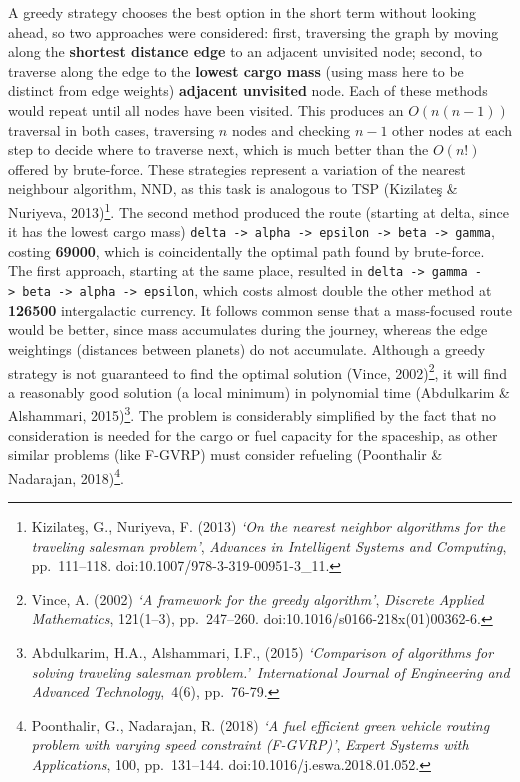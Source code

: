 \documentclass[
]{article}
\begin{document}
A greedy strategy chooses the best option in the short term without
looking ahead, so two approaches were considered: first, traversing the
graph by moving along the \textbf{shortest distance edge} to an adjacent
unvisited node; second, to traverse along the edge to the \textbf{lowest
cargo mass} (using mass here to be distinct from edge weights)
\textbf{adjacent unvisited} node. Each of these methods would repeat
until all nodes have been visited. This produces an \(O(n(n-1))\)
traversal in both cases, traversing \(n\) nodes and checking \(n-1\)
other nodes at each step to decide where to traverse next, which is much
better than the \(O(n!)\) offered by brute-force. These strategies
represent a variation of the nearest neighbour algorithm, NND, as this
task is analogous to TSP (Kizilateş \& Nuriyeva, 2013)\footnote{Kizilateş,
  G., Nuriyeva, F. (2013) \emph{`On the nearest neighbor algorithms for
  the traveling salesman problem'}, \emph{Advances in Intelligent
  Systems and Computing}, pp.~111--118.
  doi:10.1007/978-3-319-00951-3\_11.}. The second method produced the
route (starting at delta, since it has the lowest cargo mass)
\texttt{delta\ -\textgreater{}\ alpha\ -\textgreater{}\ epsilon\ -\textgreater{}\ beta\ -\textgreater{}\ gamma},
costing \textbf{69000}, which is coincidentally the optimal path found
by brute-force. The first approach, starting at the same place, resulted
in
\texttt{delta\ -\textgreater{}\ gamma\ -\textgreater{}\ beta\ -\textgreater{}\ alpha\ -\textgreater{}\ epsilon},
which costs almost double the other method at \textbf{126500}
intergalactic currency. It follows common sense that a mass-focused
route would be better, since mass accumulates during the journey,
whereas the edge weightings (distances between planets) do not
accumulate. Although a greedy strategy is not guaranteed to find the
optimal solution (Vince, 2002)\footnote{Vince, A. (2002) \emph{`A
  framework for the greedy algorithm'}, \emph{Discrete Applied
  Mathematics}, 121(1--3), pp.~247--260.
  doi:10.1016/s0166-218x(01)00362-6.}, it will find a reasonably good
solution (a local minimum) in polynomial time (Abdulkarim \& Alshammari,
2015)\footnote{Abdulkarim, H.A., Alshammari, I.F., (2015)
  \emph{`Comparison of algorithms for solving traveling salesman
  problem.'}~\emph{International Journal of Engineering and Advanced
  Technology},~4(6), pp.~76-79.}. The problem is considerably simplified
by the fact that no consideration is needed for the cargo or fuel
capacity for the spaceship, as other similar problems (like F-GVRP) must
consider refueling (Poonthalir \& Nadarajan, 2018)\footnote{Poonthalir,
  G., Nadarajan, R. (2018) \emph{`A fuel efficient green vehicle routing
  problem with varying speed constraint (F-GVRP)'}, \emph{Expert Systems
  with Applications}, 100, pp.~131--144. doi:10.1016/j.eswa.2018.01.052.}.
\end{document}
